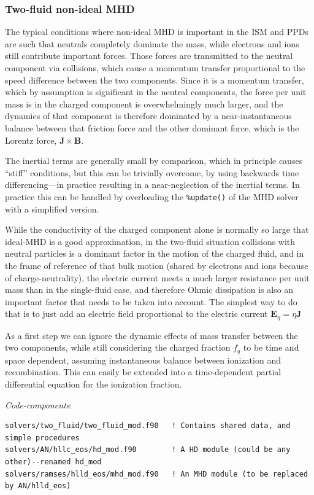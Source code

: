 \documentclass[paper=a4,fontsize=11pt]{scrartcl}
\numberwithin{equation}{section}		%
\numberwithin{figure}{section}			%
\numberwithin{table}{section}				%
\newcommand{\codecolor}{\color{Blue}}
\begin{document}
\subsubsection{Two-fluid non-ideal MHD}
The typical conditions where non-ideal MHD is important in the ISM and PPDs are such that neutrals completely dominate the mass, while electrons and ions still contribute important forces.  Those forces are transmitted to the neutral component via collisions, which cause a momentum transfer proportional to the speed difference between the two components.  Since it is a momentum transfer, which by assumption is significant in the neutral components, the force per unit mass is in the charged component is overwhelmingly much larger, and the dynamics of that component is therefore dominated by a near-instantaneous balance between that friction force and the other dominant force, which is the Lorentz force, $\mathbf{J}\times\mathbf{B}$.  

The inertial terms are generally small by comparison, which in principle causes ``stiff'' conditions, but this can be trivially overcome, by using backwards time differencing---in practice resulting in a near-neglection of the inertial terms.  In practice this can be handled by overloading the \verb|%update()| of the MHD solver with a simplified version.

While the conductivity of the charged component alone is normally so large that ideal-MHD is a good approximation, in the two-fluid situation collisions with neutral particles is a dominant factor in the motion of the charged fluid, and in the frame of reference of that bulk motion (shared by electrons and ions because of charge-neutrality), the electric current meets a much larger resistance per unit mass than in the single-fluid case, and therefore Ohmic dissipation is also an important factor that needs to be taken into account.  The simplest way to do that is to just add an electric field proportional to the electric current $\mathbf{E}_\eta = \eta \mathbf{J}$

As a first step we can ignore the dynamic effects of mass transfer between the two components, while still considering the charged fraction $f_q$ to be time and space dependent, assuming instantaneous balance between ionization and recombination.  This can easily be extended into a time-dependent partial differential equation for the ionization fraction.

\textit{Code-components}:
{\small\codecolor\begin{verbatim}
solvers/two_fluid/two_fluid_mod.f90   ! Contains shared data, and simple procedures
solvers/AN/hllc_eos/hd_mod.f90        ! A HD module (could be any other)--renamed hd_mod
solvers/ramses/hlld_eos/mhd_mod.f90   ! An MHD module (to be replaced by AN/hlld_eos)
\end{verbatim}}
\end{document}
